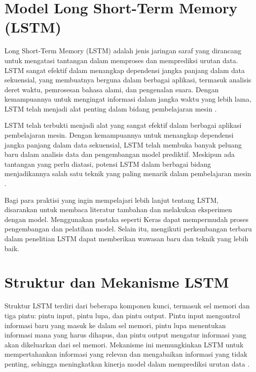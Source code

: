 \section{Model Long Short-Term Memory (LSTM)}
\par Long Short-Term Memory (LSTM) adalah jenis jaringan saraf yang dirancang untuk mengatasi tantangan dalam memproses dan memprediksi urutan data. LSTM sangat efektif dalam menangkap dependensi jangka panjang dalam data sekuensial, yang membuatnya berguna dalam berbagai aplikasi, termasuk analisis deret waktu, pemrosesan bahasa alami, dan pengenalan suara. Dengan kemampuannya untuk mengingat informasi dalam jangka waktu yang lebih lama, LSTM telah menjadi alat penting dalam bidang pembelajaran mesin \parencite{hochreiter1997}.
\par LSTM telah terbukti menjadi alat yang sangat efektif dalam berbagai aplikasi pembelajaran mesin. Dengan kemampuannya untuk menangkap dependensi jangka panjang dalam data sekuensial, LSTM telah membuka banyak peluang baru dalam analisis data dan pengembangan model prediktif. Meskipun ada tantangan yang perlu diatasi, potensi LSTM dalam berbagai bidang menjadikannya salah satu teknik yang paling menarik dalam pembelajaran mesin \parencite{graves2013}.

\par Bagi para praktisi yang ingin mempelajari lebih lanjut tentang LSTM, disarankan untuk membaca literatur tambahan dan melakukan eksperimen dengan model. Menggunakan pustaka seperti Keras dapat mempermudah proses pengembangan dan pelatihan model. Selain itu, mengikuti perkembangan terbaru dalam penelitian LSTM dapat memberikan wawasan baru dan teknik yang lebih baik.

\section{Struktur dan Mekanisme LSTM}
\par Struktur LSTM terdiri dari beberapa komponen kunci, termasuk sel memori dan tiga pintu: pintu input, pintu lupa, dan pintu output. Pintu input mengontrol informasi baru yang masuk ke dalam sel memori, pintu lupa menentukan informasi mana yang harus dihapus, dan pintu output mengatur informasi yang akan dikeluarkan dari sel memori. Mekanisme ini memungkinkan LSTM untuk mempertahankan informasi yang relevan dan mengabaikan informasi yang tidak penting, sehingga meningkatkan kinerja model dalam memprediksi urutan data \parencite{graves2013}.

